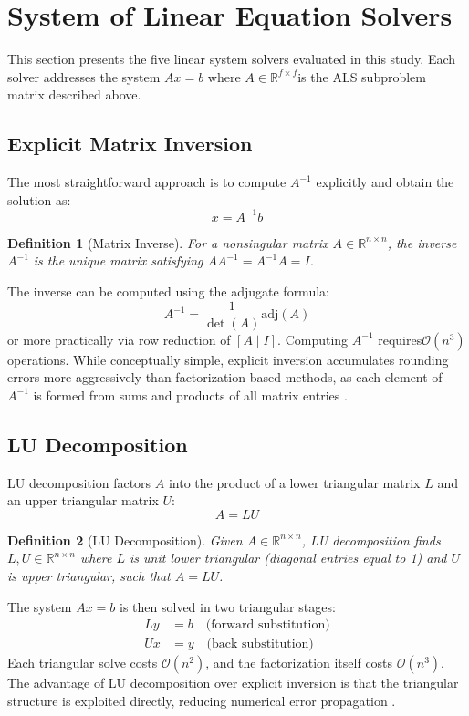 \documentclass[12pt,a4paper]{report}
\newtheorem{definition}{Definition}[chapter]
\begin{document}
\section{System of Linear Equation Solvers}

This section presents the five linear system solvers evaluated in this study. Each solver addresses the system \( Ax = b \) where \( A \in \mathbb{R}^{f \times f} \)is the ALS subproblem matrix described above.

\subsection{Explicit Matrix Inversion}

The most straightforward approach is to compute \( A^{-1} \) explicitly and obtain the solution as:
\[
    x = A^{-1} b
\]

\begin{definition}[Matrix Inverse]
    For a nonsingular matrix \( A \in \mathbb{R}^{n \times n} \), the inverse \( A^{-1} \) is the unique matrix satisfying \( A A^{-1} = A^{-1} A = I \).
\end{definition}

The inverse can be computed using the adjugate formula:
\[
    A^{-1} = \frac{1}{\det(A)} \text{adj}(A)
\]
or more practically via row reduction of \( [A \mid I] \). Computing \( A^{-1} \) requires\( \mathcal{O}(n^3) \) operations. While conceptually simple, explicit inversion accumulates rounding errors more aggressively than factorization-based methods, as each element of \( A^{-1} \) is formed from sums and products of all matrix entries \parencite{anton2014elementary}.

\subsection{LU Decomposition}

LU decomposition factors \( A \) into the product of a lower triangular matrix
\( L \) and an upper triangular matrix \( U \):
\[
    A = LU
\]

\begin{definition}[LU Decomposition]
    Given \( A \in \mathbb{R}^{n \times n} \), LU decomposition finds
    \( L, U \in \mathbb{R}^{n \times n} \) where \( L \) is unit lower triangular
    (diagonal entries equal to 1) and \( U \) is upper triangular, such that
    \( A = LU \).
\end{definition}

The system \( Ax = b \) is then solved in two triangular stages:
\begin{align*}
    Ly &= b \quad \text{(forward substitution)} \\
    Ux &= y \quad \text{(back substitution)}
\end{align*}
Each triangular solve costs \( \mathcal{O}(n^2) \), and the factorization itself costs \( \mathcal{O}(n^3) \). The advantage of LU decomposition over explicit inversion is that the triangular structure is exploited directly, reducing numerical error propagation \parencite{anton2014elementary}.
\end{document}
